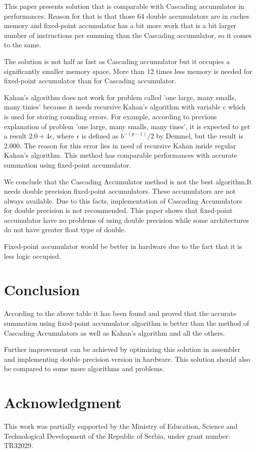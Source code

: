 \documentclass[conference]{IEEEtran}
\begin{document}
\par  
This paper presents solution that is comparable with Cascading 
accumulator in performances. Reason for that is that those 64 
double accumulators are in caches memory and fixed-point accumulator 
has a bit more work that is a bit larger number of instructions 
per summing than the Cascading accumulator, so it comes to the same.
\par 
The solution is not half as fast as Cascading accumulator but it 
occupies a significantly smaller memory space. More than 12 times 
less memory is needed for fixed-point accumulator than for Cascading accumulator.
\par 
Kahan's algorithm does not work for problem called 'one large, many smalls, many tinies'
because it needs recursive Kahan's algorithm with variable c which is used for storing rounding errors. 
For example, according to previous explanation of problem 'one large, many smalls, many tines', 
it is expected to get a result $2.0 + 4\epsilon$, where $\epsilon$ is defined as $b^{-(p-1)}/2$ by Demmel, 
but the result is 2.000. The reason for this error lies in need of 
recursive Kahan inside regular Kahan's algorithm. This method has 
comparable performances with accurate summation using fixed-point accumulator.
\par 
We conclude that the Cascading Accumulator method is not the
best algorithm.It needs double precision fixed-point accumulators.
These accumulators are not always available. Due to this facts, implementation of 
Cascading Accumulators for double precision is not recommended. 
This paper shows that fixed-point accumulator have no problems of 
using double precision while some architectures do not have greater float type of double. 
\par 
Fixed-point accumulator would be better in hardware due to the fact that it is less logic occupied.

\section{Conclusion}
According to the above table it has been found and proved
that the accurate summation using fixed-point accumulator 
algorithm is better than the method of Cascading Accumulators 
as well as Kahan's algorithm and all the others.
\par
Further improvement can be achieved by optimizing this
solution in assembler and implementing double precision version in hardware. 
This solution should also be compared to some more 
algorithms and problems. 

\section*{Acknowledgment}
This work was partially supported by the Ministry of Education, 
Science and Technological Development of the Republic of Serbia, 
under grant number: TR32029.




\end{document}
